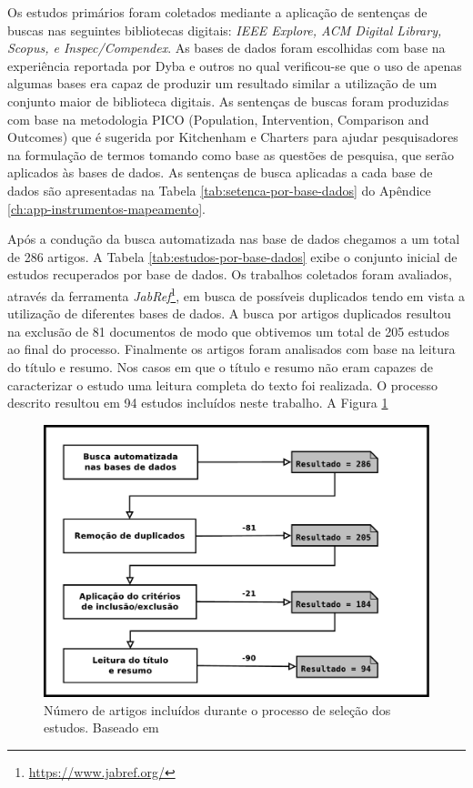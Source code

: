Os estudos primários foram coletados mediante a aplicação de sentenças de buscas nas seguintes bibliotecas digitais: \textit{IEEE Explore, ACM Digital Library, Scopus, e Inspec/Compendex}. As bases de dados foram escolhidas com base na experiência reportada por Dyba e outros \cite{dybaa2007applying}  no qual verificou-se que o uso de apenas algumas bases era capaz de produzir um resultado similar a utilização de um conjunto maior de biblioteca digitais. As sentenças de buscas foram produzidas com base na metodologia PICO (Population, Intervention, Comparison and Outcomes) que é sugerida por Kitchenham e Charters \cite{keele2007guidelines} para ajudar pesquisadores na formulação de termos tomando como base as questões de pesquisa, que serão aplicados às bases de dados. As sentenças de busca aplicadas a cada base de dados são apresentadas na Tabela \ref{tab:setenca-por-base-dados} do Apêndice \ref{ch:app-instrumentos-mapeamento}.

Após a condução da busca automatizada nas base de dados chegamos a um total de 286 artigos. A Tabela
\ref{tab:estudos-por-base-dados} exibe o conjunto inicial de estudos recuperados por base de dados.
Os trabalhos coletados foram avaliados, através da ferramenta
\textit{JabRef}\footnote{\url{https://www.jabref.org/}}, em busca de possíveis duplicados tendo em
vista a utilização de diferentes bases de dados. A busca por artigos duplicados resultou na exclusão
de 81 documentos de modo que obtivemos um total de 205 estudos ao final do processo. Finalmente os
artigos foram analisados com base na leitura do título e resumo. Nos casos em que o título e resumo
não eram capazes de caracterizar o estudo uma leitura completa do texto foi realizada. O processo
descrito resultou em 94 estudos incluídos neste trabalho. A Figura \ref{fig:diagrama-processo-selecao}


\begin{figure}
	\centering
	\includegraphics[width=0.75\linewidth]{./chapter-mapeamento-sistematico/img/diagrama-processo-selecao.pdf}
	\caption{Número de artigos incluídos durante o processo de seleção dos estudos. Baseado em \cite{Petersen2015}}
	\label{fig:diagrama-processo-selecao}
\end{figure}

